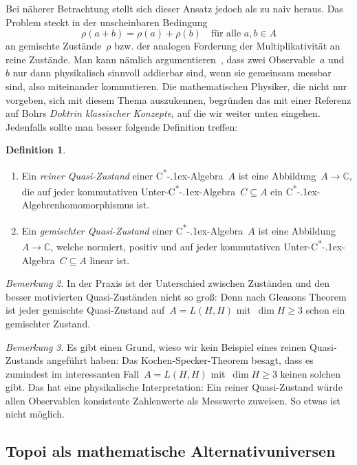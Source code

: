 \documentclass[a4paper,ngerman,12pt]{scrartcl}
\theoremstyle{definition}
\newtheorem{defn}{Definition}[section]
\theoremstyle{plain}
\theoremstyle{remark}
\newtheorem{bem}[defn]{Bemerkung}
\newcommand{\CC}{\mathbb{C}}
\newcommand{\csalgebra}{C\textsuperscript{*}\kern-.1ex-Algebra}
\newcommand{\csalgebren}{C\textsuperscript{*}\kern-.1ex-Alge\-bren}
\renewcommand{\_}{\mathpunct{.}\,}
\newcommand{\?}{\,{:}\,}
\begin{document}
Bei näherer Betrachtung stellt sich dieser Ansatz jedoch als zu naiv heraus. Das
Problem steckt in der unscheinbaren Bedingung
\[ \rho(a + b) = \rho(a) + \rho(b) \quad\text{für alle~$a,b \in A$} \]
an gemischte Zustände~$\rho$ bzw. der analogen Forderung der
Multiplikativität an reine Zustände. Man kann nämlich
argumentieren~\cite[Seite~27]{topos:aqt},
dass zwei Observable~$a$ und~$b$ nur dann physikalisch sinnvoll addierbar sind,
wenn sie gemeinsam messbar sind, also miteinander kommutieren. Die
mathematischen Physiker, die nicht nur vorgeben, sich mit diesem Thema
auszukennen, begründen das mit einer Referenz auf Bohrs \emph{Doktrin
klassischer Konzepte}, auf die wir weiter unten eingehen. Jedenfalls sollte man
besser folgende Definition treffen:

\begin{defn}\begin{enumerate}
\item
Ein \emph{reiner Quasi-Zustand} einer \csalgebra~$A$ ist eine Abbildung~$A \to \CC$,
die auf jeder kommutativen Unter-\csalgebra~$C \subseteq A$ ein
\csalgebren\-homo\-mor\-phis\-mus ist.
\item Ein \emph{gemischter Quasi-Zustand} einer \csalgebra~$A$ ist eine Abbildung~$A
\to \CC$, welche normiert, positiv und auf jeder kommutativen
Unter-\csalgebra~$C \subseteq A$ linear ist.
\end{enumerate}
\end{defn}

\begin{bem}In der Praxis ist der Unterschied zwischen Zuständen und den besser
motivierten Quasi-Zuständen nicht so groß: Denn nach Gleasons Theorem ist jeder
gemischte Quasi-Zustand auf~$A = L(H,H)$ mit~$\dim H \geq 3$ schon ein
gemischter Zustand.\end{bem}

\begin{bem}\label{bem:keine-reinen-quasi-zustaende}%
Es gibt einen Grund, wieso wir kein Beispiel eines reinen Quasi-Zustands
angeführt haben: Das Kochen-Specker-Theorem besagt, dass es zumindest im
interessanten Fall~$A = L(H,H)$ mit~$\dim H \geq 3$ keinen solchen gibt. Das
hat eine physikalische Interpretation: Ein reiner Quasi-Zustand würde allen
Observablen konsistente Zahlenwerte als Messwerte zuweisen. So etwas ist nicht
möglich.\end{bem}


\subsection{Topoi als mathematische Alternativuniversen}
\end{document}

